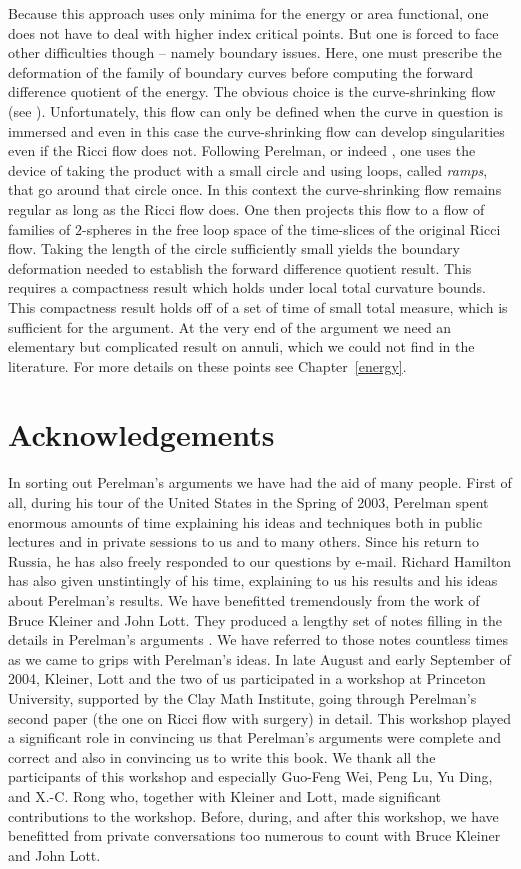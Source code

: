 Because this approach uses only minima for the energy or area
functional, one does not have to deal with higher index critical
points. But one is forced to face other difficulties though --
namely boundary issues. Here, one must prescribe the deformation of
the family of boundary curves before computing the forward
difference quotient of the energy. The obvious choice is the
curve-shrinking flow (see \cite{AG}). Unfortunately, this flow can
only be defined when the curve in question is immersed and even in
this case the curve-shrinking flow can develop singularities even if
the Ricci flow does not. Following Perelman, or indeed \cite{AG},
one uses the device of taking the product with a small circle and
using loops, called {\em ramps}, that go around that
circle once. In this context the curve-shrinking flow remains
regular as long as the Ricci flow does. One then projects this flow
to a flow of families of $2$-spheres in the free loop space of the
time-slices of the original Ricci flow. Taking the length of the
circle sufficiently small yields the boundary deformation needed to
establish the forward difference quotient result. This requires a
compactness result which holds under local total curvature bounds.
This compactness result holds off of a set of time of small total
measure, which is sufficient for the argument. At the very end of
the argument we need an elementary but complicated result on annuli,
which we could not find in the literature. For more details on these
points see Chapter~\ref{energy}.


\section{Acknowledgements}

In sorting out Perelman's arguments we have had the aid of many
people. First of all, during his tour of the United States in the
Spring of 2003, Perelman spent enormous amounts of time explaining
his ideas and techniques both in public lectures and in private
sessions to us and to many others. Since his return to Russia, he
has also freely responded to our questions by e-mail. Richard
Hamilton has also given unstintingly of his time, explaining to us
his results and his ideas about Perelman's results. We have
benefitted tremendously from the work of Bruce Kleiner and John
Lott. They produced a lengthy set of notes filling in the details in
Perelman's arguments \cite{KleinerLott}. We have referred to those
notes countless times as we came to grips with Perelman's ideas. In
late August and early September of 2004, Kleiner, Lott and the two
of us participated in  a workshop at Princeton University, supported
by the Clay Math Institute, going through Perelman's second paper
(the one on Ricci flow with surgery) in detail. This workshop played
a significant role in convincing us that Perelman's arguments were
complete and correct and also in convincing us to write this book.
We thank all the participants of this workshop and especially
Guo-Feng Wei, Peng Lu, Yu Ding, and X.-C. Rong  who, together with
Kleiner and Lott, made significant contributions to the workshop.
Before, during, and after this workshop, we have benefitted from
private conversations too numerous to count with Bruce Kleiner and
John Lott.

